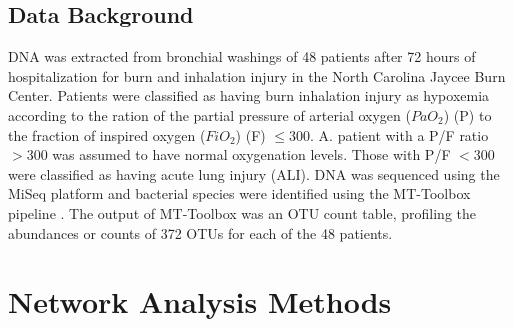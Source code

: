  \subsection{Data Background}
\indent DNA was extracted from bronchial washings of 48 patients after 72 hours of hospitalization for burn and inhalation injury in the North Carolina Jaycee Burn Center. Patients were classified as having burn inhalation injury as hypoxemia according to the ration of the partial pressure of arterial oxygen ($PaO_{2}$) (P) to the fraction of inspired oxygen ($FiO_{2}$) (F) $\le 300$. A. patient with a P/F ratio $>300$ was assumed to have normal oxygenation levels. Those with P/F $<300$ were classified as having acute lung injury (ALI). DNA was sequenced using the MiSeq \cite{miSeq} platform and bacterial species were identified using the MT-Toolbox pipeline \cite{your}. The output of MT-Toolbox was an OTU count table, profiling the abundances or counts of 372 OTUs for each of the 48 patients.

\section{Network Analysis Methods}
